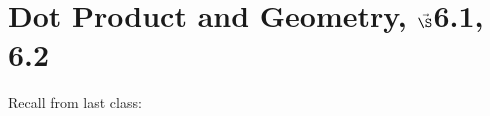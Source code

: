 


%
%
%
%

\section{{Dot Product and Geometry, $\vec\S$6.1, 6.2}}%
% 

%
\thispagestyle{fancy}

Recall from last class:

